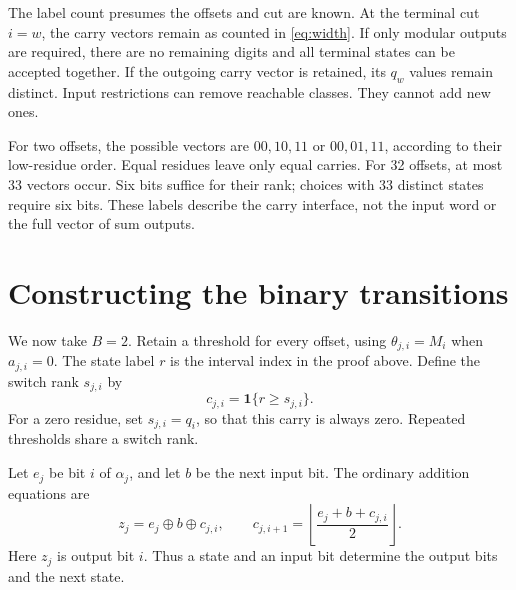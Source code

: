 \documentclass[11pt,a4paper]{article}
\newcommand{\ind}{\mathbf 1}
\begin{document}
The label count presumes the offsets and cut are known.
At the terminal cut $i=w$, the carry vectors remain as counted in
\eqref{eq:width}. If only modular outputs are required, there are no
remaining digits and all terminal states can be accepted together.
If the outgoing carry vector is retained, its $q_w$ values remain distinct.
Input restrictions can remove reachable classes. They cannot add new ones.

For two offsets, the possible vectors are $00,10,11$ or $00,01,11$,
according to their low-residue order. Equal residues leave only equal carries.
For 32 offsets, at most 33 vectors occur. Six bits suffice for their rank;
choices with 33 distinct states require six bits.
These labels describe the carry interface, not the input word or the full
vector of sum outputs.

\section{Constructing the binary transitions}
We now take $B=2$. Retain a threshold for every offset, using
$\theta_{j,i}=M_i$ when $a_{j,i}=0$.
The state label $r$ is the interval index in the proof above.
Define the switch rank $s_{j,i}$ by
\begin{equation}\label{eq:switch}
 c_{j,i}=\ind\{r\geq s_{j,i}\}.
\end{equation}
For a zero residue, set $s_{j,i}=q_i$, so that this carry is always zero.
Repeated thresholds share a switch rank.

Let $e_j$ be bit $i$ of $\alpha_j$, and let $b$ be the next input bit.
The ordinary addition equations are
\begin{equation}\label{eq:transition}
 z_j=e_j\oplus b\oplus c_{j,i},\qquad
 c_{j,i+1}=\left\lfloor\frac{e_j+b+c_{j,i}}2\right\rfloor.
\end{equation}
Here $z_j$ is output bit $i$. Thus a state and an input bit determine the
output bits and the next state.
\end{document}
